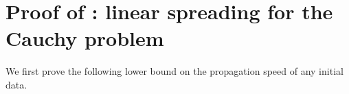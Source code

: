 \documentclass[11pt]{article}    %
\newcommand{\R}{\mathbb{R}}
\begin{document}
% 





\section{Proof of : linear spreading for the Cauchy problem}\label{sec:cauchy_finite}

We first prove the following lower bound on the propagation speed of any initial data.
\end{document}

